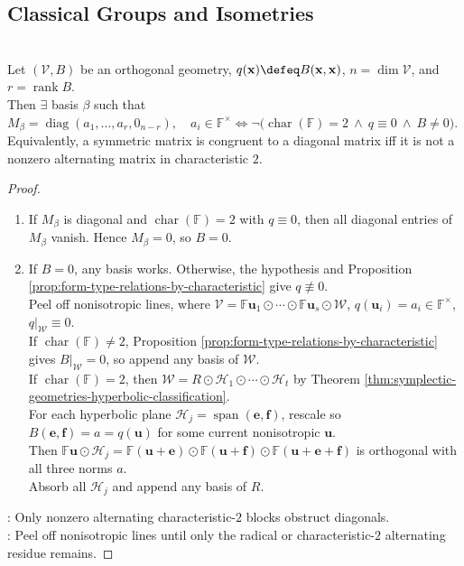 \subsection{Classical Groups and Isometries}

\begin{theorem} \label{thm:orthogonal-bases-and-diagonal-congruence} \\
Let $(\mathcal{V},B)$ be an orthogonal geometry, $q(\mathbf{x})\defeq B(\mathbf{x},\mathbf{x})$, $n=\dim\mathcal{V}$, and $r=\operatorname{rank}B$.\\
Then $\exists$ basis $\beta$ such that $M_{\beta}=\operatorname{diag}(a_1,\ldots,a_r,0_{n-r}),\quad a_i\in\mathbb{F}^{\times} \iff \neg\bigl(\operatorname{char}(\mathbb{F})=2\ \wedge\ q\equiv0\ \wedge\ B\neq0\bigr)$.\\
Equivalently, a symmetric matrix is congruent to a diagonal matrix iff it is not a nonzero alternating matrix in characteristic $2$.
\begin{proof}
\begin{enumerate}[label=\roman*.]
\setlength{\itemsep}{0pt}
\item[$(\Rightarrow)$] If $M_{\beta}$ is diagonal and $\operatorname{char}(\mathbb{F})=2$ with $q\equiv0$, then all diagonal entries of $M_{\beta}$ vanish. Hence $M_{\beta}=0$, so $B=0$.
\item[$(\Leftarrow)$] If $B=0$, any basis works. Otherwise, the hypothesis and Proposition \ref{prop:form-type-relations-by-characteristic} give $q\not\equiv0$.\\
Peel off nonisotropic lines, where $\mathcal{V} =\mathbb{F}\mathbf{u}_1\odot\cdots\odot\mathbb{F}\mathbf{u}_s\odot\mathcal{W}$, $q(\mathbf{u}_i)=a_i\in\mathbb{F}^{\times}$, $q|_{\mathcal{W}}\equiv0$.\\
If $\operatorname{char}(\mathbb{F})\neq2$, Proposition \ref{prop:form-type-relations-by-characteristic} gives $B|_{\mathcal{W}}=0$, so append any basis of $\mathcal{W}$.\\
If $\operatorname{char}(\mathbb{F})=2$, then $\mathcal{W}=R\odot\mathcal{H}_1\odot\cdots\odot\mathcal{H}_t$ by Theorem \ref{thm:symplectic-geometries-hyperbolic-classification}.\\
For each hyperbolic plane $\mathcal{H}_j=\operatorname{span}(\mathbf{e},\mathbf{f})$, rescale so $B(\mathbf{e},\mathbf{f})=a=q(\mathbf{u})$ for some current nonisotropic $\mathbf{u}$.\\
Then $\mathbb{F}\mathbf{u}\odot\mathcal{H}_j = \mathbb{F}(\mathbf{u}+\mathbf{e}) \odot \mathbb{F}(\mathbf{u}+\mathbf{f}) \odot \mathbb{F}(\mathbf{u}+\mathbf{e}+\mathbf{f})$ is orthogonal with all three norms $a$.\\
Absorb all $\mathcal{H}_j$ and append any basis of $R$.
\end{enumerate}
: Only nonzero alternating characteristic-$2$ blocks obstruct diagonals.\\
: Peel off nonisotropic lines until only the radical or characteristic-$2$ alternating residue remains.
\end{proof}
\end{theorem}


